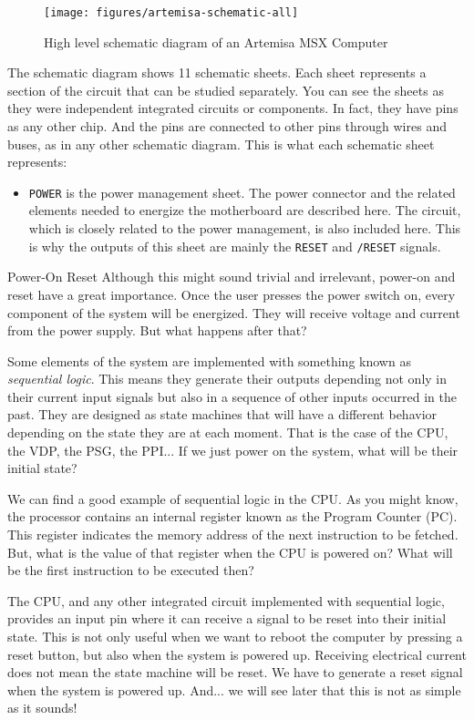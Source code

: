 \begin{figure}
  \centering
  \texttt{[image: figures/artemisa-schematic-all]}
  \caption{High level schematic diagram of an Artemisa MSX Computer}
  \label{fig:artemisa-arch-overview}
\end{figure}

The schematic diagram shows 11 schematic sheets. Each sheet represents a section of the circuit that can be studied separately. You can see the sheets as they were independent integrated circuits or components. In fact, they have pins as any other chip. And the pins are connected to other pins through wires and buses, as in any other schematic diagram. This is what each schematic sheet represents:

\begin{itemize}
  \item {\tt POWER} is the power management sheet. The power connector and the related elements needed to energize the motherboard are described here. The  circuit, which is closely related to the power management, is also included here. This is why the outputs of this sheet are mainly the {\tt RESET} and {\tt /RESET} signals.
\end{itemize}

\begin{theory}{Power-On Reset}
  Although this might sound trivial and irrelevant, power-on and reset have a great importance. Once the user presses the power switch on, every component of the system will be energized. They will receive voltage and current from the power supply. But what happens after that?

  Some elements of the system are implemented with something known as {\it sequential logic}. This means they generate their outputs depending not only in their current input signals but also in a sequence of other inputs occurred in the past. They are designed as state machines that will have a different behavior depending on the state they are at each moment. That is the case of the CPU, the VDP, the PSG, the PPI... If we just power on the system, what will be their initial state?

  We can find a good example of sequential logic in the CPU. As you might know, the processor contains an internal register known as the Program Counter (PC). This register indicates the memory address of the next instruction to be fetched. But, what is the value of that register when the CPU is powered on? What will be the first instruction to be executed then?

  The CPU, and any other integrated circuit implemented with sequential logic, provides an input pin where it can receive a signal to be reset into their initial state. This is not only useful when we want to reboot the computer by pressing a reset button, but also when the system is powered up. Receiving electrical current does not mean the state machine will be reset. We have to generate a reset signal when the system is powered up. And... we will see later that this is not as simple as it sounds!
\end{theory}


